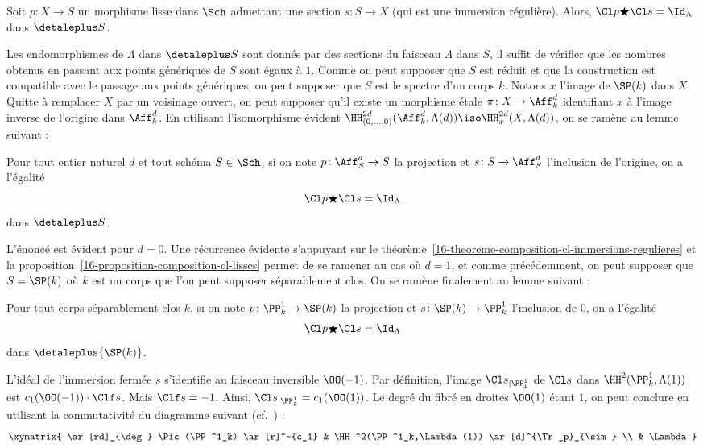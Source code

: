 \documentclass[10pt]{../fichiers-configuration-latex/smfart}
\begin{document}
\medskip

\begin{lemme2}
Soit $p\colon X\to S$ un morphisme lisse dans $\Sch$
admettant une section $s\colon
S\to X$ (qui est une immersion régulière). Alors, $\Cl p\bigstar \Cl
s=\Id_\Lambda$ dans $\detaleplus S$.
\end{lemme2}

Les endomorphismes de $\Lambda$ dans $\detaleplus S$ sont donnés par des sections
du faisceau $\Lambda$ dans $S$, il suffit de vérifier que les nombres
obtenus en passant aux points génériques de $S$ sont égaux à $1$. Comme on
peut supposer que $S$ est réduit et que la construction est compatible avec
le passage aux points génériques, on peut supposer que $S$ est le
spectre d'un corps $k$. Notons $x$ l'image de $\SP(k)$ dans $X$. Quitte à
remplacer $X$ par un voisinage ouvert, on peut supposer qu'il existe un
morphisme étale $\pi\colon X\to \Aff^d_k$ identifiant $x$ à l'image inverse
de l'origine dans $\Aff^d_k$. En utilisant l'isomorphisme évident
$\HH^{2d}_{(0,\dots,0)}(\Aff^d_k,\Lambda(d))\iso
\HH^{2d}_{x}(X,\Lambda(d))$, on se ramène au lemme suivant :

\begin{lemme2}
Pour tout entier naturel $d$ et tout schéma $S\in \Sch$, si on note $p\colon
\Aff^d_S\to S$ la projection et $s\colon S\to \Aff^d_S$ l'inclusion de
l'origine, on a l'égalité
\[\Cl p\bigstar \Cl s=\Id_\Lambda \]
dans $\detaleplus S$.
\end{lemme2}

L'énoncé est évident pour $d=0$. Une récurrence évidente s'appuyant sur le
théorème~\ref{16-theoreme-composition-cl-immersions-regulieres} et la
proposition~\ref{16-proposition-composition-cl-lisses} permet de se ramener au
cas où $d=1$, et comme précédemment, on peut supposer que $S=\SP(k)$ où
$k$ est un corps que l'on peut supposer séparablement clos. On se ramène
finalement au lemme suivant :

\begin{lemme2}\label{16-lemme-compatibilite-trace-c-un}
Pour tout corps séparablement clos $k$, si on note $p\colon \PP^1_k\to
\SP(k)$ la projection et $s\colon \SP(k)\to \PP^1_k$ l'inclusion de
$0$, on a l'égalité
\[\Cl p\bigstar \Cl s=\Id_\Lambda \]
dans $\detaleplus {\SP(k)}$.
\end{lemme2}

L'idéal de l'immersion fermée $s$ s'identifie au faisceau inversible
$\OO(-1)$. Par définition, l'image ${\Cl s}_{|\PP^1_k}$
de $\Cl s$ dans $\HH^2(\PP^1_k,\Lambda(1))$
est $c_1(\OO(-1))\cdot \Clf s$. Mais $\Clf s=-1$. Ainsi,
${\Cl s}_{|\PP^1_k}=c_1(\OO(1))$. Le degré du fibré en droites
$\OO(1)$ étant $1$, on peut conclure en utilisant la commutativité
du diagramme suivant (cf.~) :
\[
\xymatrix{
\ar[rd]_{\deg} \Pic(\PP^1_k) \ar[r]^-{c_1} &
\HH^2(\PP^1_k,\Lambda(1)) \ar[d]^{\Tr_p}_{\sim} \\
& \Lambda}
\]
\end{document}
